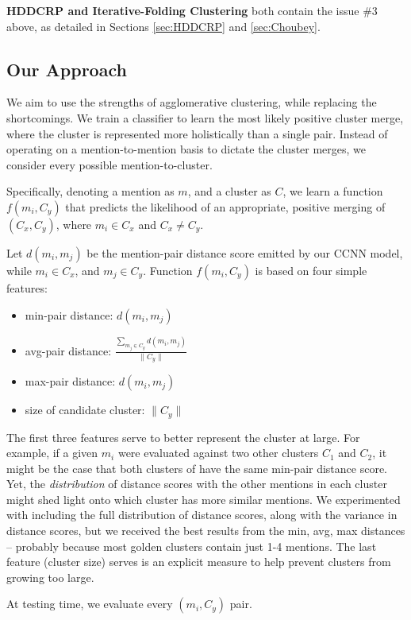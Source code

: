 \documentclass[11pt,a4paper]{article}
\begin{document}
\textbf{HDDCRP and Iterative-Folding Clustering} both contain the issue \#3 above, as detailed in Sections \ref{sec:HDDCRP} and \ref{sec:Choubey}.

\subsection{Our Approach}
We aim to use the strengths of agglomerative clustering, while replacing the shortcomings.  We train a classifier to learn the most likely {positive cluster merge}, where the cluster is represented more holistically than a single pair.  Instead of operating on a mention-to-mention basis to dictate the cluster merges, we consider every possible mention-to-cluster.

Specifically, denoting a mention as $m$, and a cluster as $C$, we learn a function $f(m_i,C_y)$ that predicts the likelihood of an appropriate, positive merging of $(C_x,C_y)$, where $m_i \in C_x$ and $C_x \neq C_y$.

Let $d(m_i,m_j)$ be the mention-pair distance score emitted by our CCNN model, while $m_i \in C_x$, and $m_j \in C_y$.  Function $f(m_i,C_y)$ is based on four simple features:
\begin{itemize}
  \item min-pair distance: $d(m_i,m_j)$
  \item avg-pair distance: $\frac{\sum_{m_j \in C_y} d(m_i,m_j)}{\|C_y\|}$
  \item max-pair distance: $d(m_i,m_j)$
  \item size of candidate cluster: $\|C_y\|$
\end{itemize}

The first three features serve to better represent the cluster at large.  For example, if a given $m_i$ were evaluated against two other clusters $C_1$ and $C_2$, it might be the case that both clusters of have the same min-pair distance score.  Yet, the \textit{distribution} of distance scores with the other mentions in each cluster might shed light onto which cluster has more similar mentions.  We experimented with including the full distribution of distance scores, along with the variance in distance scores, but we received the best results from the min, avg, max distances -- probably because most golden clusters contain just 1-4 mentions.  The last feature (cluster size) serves is an explicit measure to help prevent clusters from growing too large.

At testing time, we evaluate every $(m_i, C_y)$ pair.  
\end{document}
